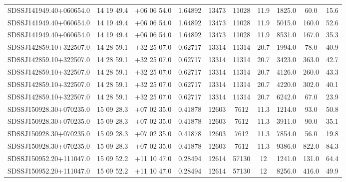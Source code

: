\begin{landscape}
\begin{center}
\begin{longtable}{l c c c c c c c c c}
SDSSJ141949.40+060654.0  & 14 19 49.4  &         $+$06 06 54.0  &       1.64892  & 13473  &   11028  &      11.9  &      1825.0  &  60.0  &   15.6  \\
SDSSJ141949.40+060654.0  & 14 19 49.4  &         $+$06 06 54.0  &       1.64892  & 13473  &   11028  &      11.9  &      5015.0  &  160.0  &  52.6  \\
SDSSJ141949.40+060654.0  & 14 19 49.4  &         $+$06 06 54.0  &       1.64892  & 13473  &   11028  &      11.9  &      8531.0  &  167.0  &  35.3  \\
SDSSJ142859.10+322507.0  & 14 28 59.1  &         $+$32 25 07.0  &       0.62717  & 13314  &   11314  &      20.7  &      1994.0  &  78.0  &   40.9  \\
SDSSJ142859.10+322507.0  & 14 28 59.1  &         $+$32 25 07.0  &       0.62717  & 13314  &   11314  &      20.7  &      3423.0  &  363.0  &  42.7  \\
SDSSJ142859.10+322507.0  & 14 28 59.1  &         $+$32 25 07.0  &       0.62717  & 13314  &   11314  &      20.7  &      4126.0  &  260.0  &  43.3  \\
SDSSJ142859.10+322507.0  & 14 28 59.1  &         $+$32 25 07.0  &       0.62717  & 13314  &   11314  &      20.7  &      4220.0  &  302.0  &  40.1  \\
SDSSJ142859.10+322507.0  & 14 28 59.1  &         $+$32 25 07.0  &       0.62717  & 13314  &   11314  &      20.7  &      6242.0  &  67.0  &   23.9  \\
SDSSJ150928.30+070235.0  & 15 09 28.3  &         $+$07 02 35.0  &       0.41878  & 12603  &   7612  &       11.3  &      1214.0  &  93.0  &   50.8  \\
SDSSJ150928.30+070235.0  & 15 09 28.3  &         $+$07 02 35.0  &       0.41878  & 12603  &   7612  &       11.3  &      3911.0  &  90.0  &   35.1  \\
SDSSJ150928.30+070235.0  & 15 09 28.3  &         $+$07 02 35.0  &       0.41878  & 12603  &   7612  &       11.3  &      7854.0  &  56.0  &   19.8  \\
SDSSJ150928.30+070235.0  & 15 09 28.3  &         $+$07 02 35.0  &       0.41878  & 12603  &   7612  &       11.3  &      9386.0  &  822.0  &  84.3  \\
SDSSJ150952.20+111047.0  & 15 09 52.2  &         $+$11 10 47.0  &       0.28494  & 12614  &   57130  &      12  &        1241.0  &  131.0  &  64.4  \\
SDSSJ150952.20+111047.0  & 15 09 52.2  &         $+$11 10 47.0  &       0.28494  & 12614  &   57130  &      12  &        8256.0  &  416.0  &  49.9  \\

\end{longtable}
\end{center}
\end{landscape}
